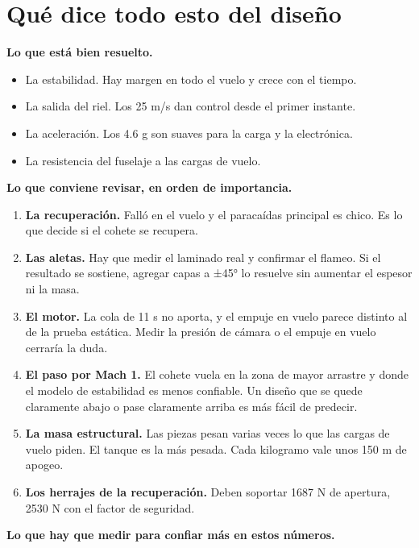 \section{Qué dice todo esto del
diseño}\label{quuxe9-dice-todo-esto-del-diseuxf1o}

\textbf{Lo que está bien resuelto.}

\begin{itemize}
\tightlist
\item
  La estabilidad. Hay margen en todo el vuelo y crece con el
  tiempo.
\item
  La salida del riel. Los 25 m/s dan control desde el primer
  instante.
\item
  La aceleración. Los 4.6 g son suaves para la carga y la
  electrónica.
\item
  La resistencia del fuselaje a las cargas de vuelo.
\end{itemize}

\textbf{Lo que conviene revisar, en orden de importancia.}

\begin{enumerate}
\def\labelenumi{\arabic{enumi}.}
\tightlist
\item
  \textbf{La recuperación.} Falló en el vuelo y el
  paracaídas principal es chico. Es lo que decide si el
  cohete se recupera.
\item
  \textbf{Las aletas.} Hay que medir el laminado real y
  confirmar el flameo. Si el resultado se sostiene, agregar
  capas a ±45° lo resuelve sin aumentar el espesor ni la
  masa.
\item
  \textbf{El motor.} La cola de 11 s no aporta, y el empuje
  en vuelo parece distinto al de la prueba estática. Medir
  la presión de cámara o el empuje en vuelo cerraría la
  duda.
\item
  \textbf{El paso por Mach 1.} El cohete vuela en la zona de
  mayor arrastre y donde el modelo de estabilidad es menos
  confiable. Un diseño que se quede claramente abajo o pase
  claramente arriba es más fácil de predecir.
\item
  \textbf{La masa estructural.} Las piezas pesan varias
  veces lo que las cargas de vuelo piden. El tanque es la
  más pesada. Cada kilogramo vale unos 150 m de apogeo.
\item
  \textbf{Los herrajes de la recuperación.} Deben soportar
  1687 N de apertura, 2530 N con el factor de seguridad.
\end{enumerate}

\textbf{Lo que hay que medir para confiar más en estos
números.}

